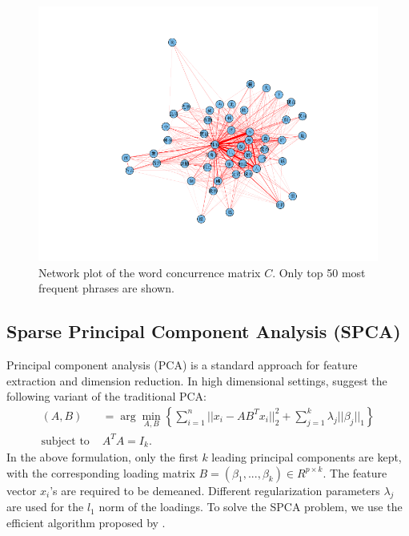 \documentclass[11pt]{article}
\newcommand{\1}[1]{{\mathbf 1}\left\{#1\right\}}        %
\begin{document}
\begin{center}
\begin{figure}[tb]
   \centering
   \includegraphics[width=\textwidth]{../coocurResults/cooccurNetwork.png} 
      \caption{Network plot of the word concurrence matrix $C$. Only top 50 most frequent phrases are shown.}
   \label{fig:coocur}
\end{figure}
\end{center}



\subsection{Sparse Principal Component Analysis (SPCA)}
Principal component analysis (PCA) is a standard approach for feature extraction and dimension reduction. In high dimensional settings, \cite{zou2006sparse} suggest the following variant of the traditional PCA:
\begin{align*}
(A,B) & = \arg \min_{A,B} \left \{ \sum_{i=1}^n||x_i-AB^Tx_i||_2^2 + \sum_{j=1}^k\lambda_{j}||\beta_j||_1 \right\} \\ 
\text{subject to } & A^TA = I_{k}. \nonumber
\end{align*}
In the above formulation, only the first $k$ leading principal components are kept, with the corresponding loading matrix $B = (\beta_1,...,\beta_k) \in R^{p\times k}$. The feature vector $x_i$'s are required to be demeaned. Different regularization parameters $\lambda_{j}$ are used for the $l_1$ norm of the loadings. To solve the SPCA problem, we use the efficient algorithm proposed by \cite{zou2006sparse}. 
\end{document}
